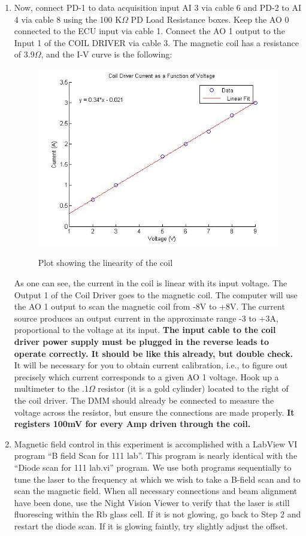 \documentclass{../lab}
\begin{document}
\begin{enumerate}
    \item Now, connect PD-1 to data acquisition input AI 3 via cable 6 and PD-2 to AI 4 via cable 8 using the 100 K$\Omega$ PD Load Resistance boxes. Keep the AO 0 connected to the ECU input via cable 1. Connect the AO 1 output to the Input 1 of the COIL DRIVER via cable 3. The magnetic coil has a resistance of 3.9$\Omega$, and the I-V curve is the following:
    \begin{figure}[h]
        \centering
        \href{http://experimentationlab.berkeley.edu/sites/default/files/images/Voltagecurrentplot.jpg}{\includegraphics[width=0.5\linewidth]{images/Voltagecurrentplot.jpg}}
        \caption{Plot showing the linearity of the coil}
        \label{fig:Voltagecurrentplot}
    \end{figure}
    
    As one can see, the current in the coil is linear with its input voltage. The Output 1 of the Coil Driver goes to the magnetic coil. The computer will use the AO 1 output to scan the magnetic coil from -8V to +8V. The current source produces an output current in the approximate range -3 to +3A, proportional to the voltage at its input. \textbf{The input cable to the coil driver power supply must be plugged in the reverse leads to operate correctly. It should be like this already, but double check.} It will be necessary for you to obtain current calibration, i.e., to figure out precisely which current corresponds to a given AO 1 voltage. Hook up a multimeter to the .1$\Omega$ resistor (it is a gold cylinder) located to the right of the coil driver. The DMM should already be connected to measure the voltage across the resistor, but ensure the connections are made properly. \textbf{It registers 100mV for every Amp driven through the coil.}

    \item Magnetic field control in this experiment is accomplished with a LabView VI program ``B field Scan for 111 lab''. This program is nearly identical with the ``Diode scan for 111 lab.vi'' program. We use both programs sequentially to tune the laser to the frequency at which we wish to take a B-field scan and to scan the magnetic field. When all necessary connections and beam alignment have been done, use the Night Vision Viewer to verify that the laser is still fluorescing within the Rb glass cell. If it is not glowing, go back to Step 2 and restart the diode scan. If it is glowing faintly, try slightly adjust the offset.
    

\end{enumerate}
\end{document}
